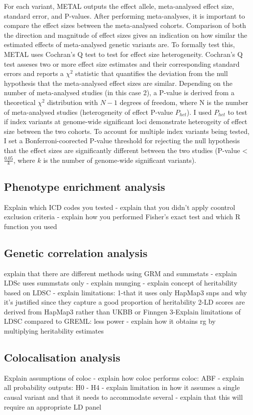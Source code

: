 For each variant, METAL outputs the effect allele, meta-analysed effect size, standard error, and P-values. After performing meta-analyses, it is important to compare the effect sizes between the meta-analysed cohorts. Comparison of both the direction and magnitude of effect sizes gives an indication on how similar the estimated effects of meta-analysed genetic variants are. To formally test this, METAL uses Cochran's Q test to test for effect size heterogeneity. Cochran's Q test asseses two or more effect size estimates and their corresponding standard errors and reports a $\chi^{2}$ statistic that quantifies the deviation from the null hypothesis that the meta-analysed effect sizes are similar. Depending on the number of meta-analysed studies (in this case 2), a P-value is derived from a theoretical $\chi^{2}$ distribution with $N-1$ degrees of freedom, where N is the number of meta-analysed studies (heterogeneity of effect P-value $P_{het}$). I used $P_{het}$ to test if index variants at genome-wide significant loci demonstrate heterogeity of effect size between the two cohorts. To account for multiple index variants being tested, I set a Bonferroni-coorected P-value threshold for rejecting the null hypothesis that the effect sizes are significantly different between the two studies (P-value < $\frac{0.05}{k}$, where $k$ is the number of genome-wide significant variants).


\subsection{Phenotype enrichment analysis}
Explain which ICD codes you tested - explain that you didn't apply coontrol exclusion criteria - explain how you performed Fisher's exact test and which R function you used
\subsection{Genetic correlation analysis}
explain that there are different methods using GRM and summstats - explain LDSc uses summstats only - explain munging - explain concept of heritability based on LDSC - explain limitations: 1-that it uses only HapMap3 snps and why it's justified since they capture a good proportion of heritability 2-LD scores are derived from HapMap3 rather than UKBB or Finngen 3-Explain limitations of LDSC compared to GREML: less power - explain how it obtains rg by multiplying heritability estimates
\subsection{Colocalisation analysis}
Explain assumptions of coloc - explain how coloc performs coloc: ABF - explain all probability outputs: H0 - H4 - explain limitation in how it assumes a single causal variant and that it needs to accommodate several - explain that this will require an appropriate LD panel 



